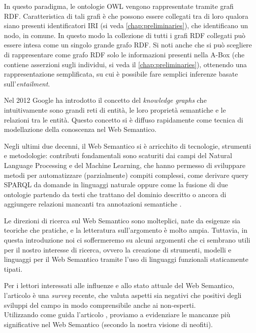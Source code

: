 In questo paradigma, le ontologie OWL vengono rappresentate tramite grafi RDF. Caratteristica di tali grafi è che possono essere collegati tra di loro qualora siano presenti identificatori IRI (si veda \autoref{chap:preliminaries}), che identificano un nodo, in comune. In questo modo la collezione di tutti i grafi RDF collegati può essere intesa come un singolo grande grafo RDF. Si noti anche che si può scegliere di rappresentare come grafo RDF solo le informazioni presenti nella A-Box (che contiene asserzioni sugli individui, si veda il \autoref{chap:preliminaries}), ottenendo una rappresentazione semplificata, su cui è possibile fare semplici inferenze basate sull'\emph{entailment}.

Nel 2012 Google ha introdotto il concetto del \emph{knowledge graphs} che intuitivamente sono grandi reti di entità, le loro proprietà semantiche e le relazioni tra le entità. Questo concetto si è diffuso rapidamente come tecnica di modellazione della conoscenza nel Web Semantico.


Negli ultimi due decenni, il Web Semantico si è arricchito di tecnologie, strumenti e metodologie: contributi fondamentali sono scaturiti dai campi del Natural Language Processing e del Machine Learning, che hanno permesso di sviluppare metodi per automatizzare (parzialmente) compiti complessi, come derivare query SPARQL da domande in linguaggi naturale \cite{Evseev2020SPARQLQG, Zlatareva2021ProcessingNL, Hu2021NaturalLQ} oppure come la fusione di due ontologie partendo da testi che trattano del dominio descritto \cite{caldarolaMultiStrategyApproach} o ancora di aggiungere relazioni mancanti tra annotazioni semantiche \cite{discoveringmissingsemanticrelation, repairinghiddenlinks}. 

Le direzioni di ricerca sul Web Semantico sono molteplici, nate da esigenze sia teoriche che pratiche, e la letteratura sull'argomento è molto ampia. Tuttavia, in questa introduzione noi ci soffermeremo su alcuni argomenti che ci sembrano utili per il nostro interesse di ricerca, ovvero la creazione di strumenti, modelli e linguaggi per il Web Semantico tramite l'uso di linguaggi funzionali staticamente tipati.

Per i lettori interessati alle influenze e allo stato attuale del Web Semantico, l'articolo \cite{hitzler2021review} è una \emph{survey} recente, che valuta aspetti sia negativi che positivi degli sviluppi del campo in modo comprensibile anche ai non-esperti.\\
Utilizzando come guida l'articolo \cite{hitzler2021review}, proviamo a evidenziare le mancanze più significative nel Web Semantico (secondo la nostra visione di neofiti).
